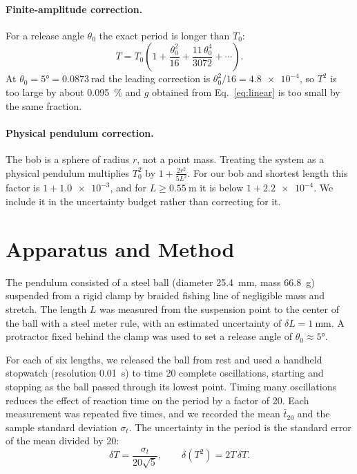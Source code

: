 \documentclass[11pt,a4paper]{article}
\begin{document}
\paragraph{Finite-amplitude correction.} For a release angle $\theta_0$ the exact period is longer than $T_0$:
\begin{equation}
  T = T_0\left(1 + \frac{\theta_0^2}{16} + \frac{11\,\theta_0^4}{3072} + \cdots\right).
  \label{eq:amplitude}
\end{equation}
At $\theta_0 = \ang{5} = \SI{0.0873}{\radian}$ the leading correction is $\theta_0^2/16 = \num{4.8e-4}$, so $T^2$ is too large by about \SI{0.095}{\percent} and $g$ obtained from Eq.~\eqref{eq:linear} is too small by the same fraction.

\paragraph{Physical pendulum correction.} The bob is a sphere of radius $r$, not a point mass. Treating the system as a physical pendulum multiplies $T_0^2$ by $1 + \frac{2r^2}{5L^2}$. For our bob and shortest length this factor is $1 + \num{1.0e-3}$, and for $L \ge \SI{0.55}{\meter}$ it is below $1 + \num{2.2e-4}$. We include it in the uncertainty budget rather than correcting for it.

\section{Apparatus and Method}

The pendulum consisted of a steel ball (diameter \SI{25.4}{\milli\meter}, mass \SI{66.8}{\gram}) suspended from a rigid clamp by braided fishing line of negligible mass and stretch. The length $L$ was measured from the suspension point to the center of the ball with a steel meter rule, with an estimated uncertainty of $\delta L = \SI{1}{\milli\meter}$. A protractor fixed behind the clamp was used to set a release angle of $\theta_0 \approx \ang{5}$.

For each of six lengths, we released the ball from rest and used a handheld stopwatch (resolution \SI{0.01}{\second}) to time 20 complete oscillations, starting and stopping as the ball passed through its lowest point. Timing many oscillations reduces the effect of reaction time on the period by a factor of 20. Each measurement was repeated five times, and we recorded the mean $\bar{t}_{20}$ and the sample standard deviation $\sigma_t$. The uncertainty in the period is the standard error of the mean divided by 20:
\begin{equation}
  \delta T = \frac{\sigma_t}{20\sqrt{5}}, \qquad \delta(T^2) = 2T\,\delta T.
  \label{eq:period-uncertainty}
\end{equation}
\end{document}
